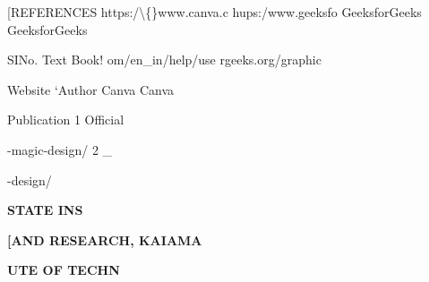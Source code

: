 \documentclass[10pt,a4paper]{article}
\begin{document}
\noindent [REFERENCES           https:/\textbackslash\{\}www.canva.c   hups:/www.geeksfo    GeeksforGeeks   GeeksforGeeks\par
\noindent SINo. Text Book!      om/en\_in/help/use     rgeeks.org/graphic\par
\noindent Website ‘Author       Canva Canva\par
\noindent Publication 1         Official\par
\noindent -magic-design/ 2 \_\par

\noindent -design/\par
\medskip\noindent\textbf{STATE INS}\par
\medskip\noindent\textbf{[AND RESEARCH, KAIAMA}\par
\medskip\noindent\textbf{UTE OF TECHN}\par
\end{document}
